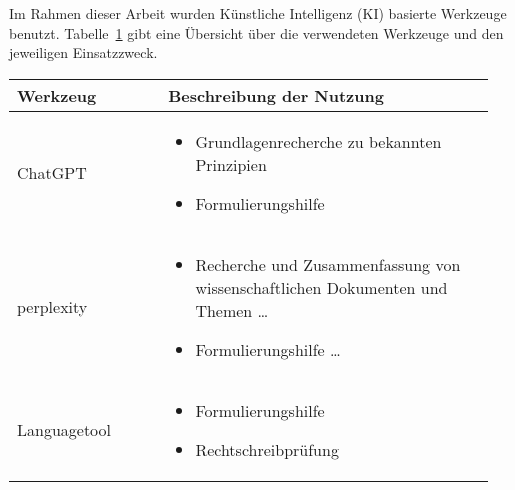 \setcounter{chapter}{1}

Im Rahmen dieser Arbeit wurden Künstliche Intelligenz (KI) basierte Werkzeuge benutzt. Tabelle~\ref{tab:anhang_uebersicht_KI_werkzeuge} gibt eine Übersicht über die verwendeten Werkzeuge und den jeweiligen Einsatzzweck.

\begin{table}[hbt]	
	\centering
	\renewcommand{\arraystretch}{1.5}	%
	\label{tab:anhang_uebersicht_KI_werkzeuge}
	\begin{tabular}{>{\raggedright\arraybackslash}p{0.3\linewidth} >{\raggedright\arraybackslash}p{0.65\linewidth}}
		\textbf{Werkzeug} & \textbf{Beschreibung der Nutzung}\\
		\hline 
		\hline
		ChatGPT & 	\vspace{-\topsep}
					\begin{itemize}[noitemsep,topsep=0pt,partopsep=0pt,parsep=0pt] 
						\item Grundlagenrecherche zu bekannten Prinzipien 
						\item Formulierungshilfe
				   	\end{itemize} \\
		perplexity &	\vspace{-\topsep}
					\begin{itemize}[noitemsep,topsep=0pt,partopsep=0pt,parsep=0pt] 
					\item Recherche und Zusammenfassung von wissenschaftlichen Dokumenten und  Themen \ldots
					\item Formulierungshilfe \ldots
					\end{itemize} \\ 
		Languagetool	&	\vspace{-\topsep}
	\begin{itemize}[noitemsep,topsep=0pt,partopsep=0pt,parsep=0pt]
		\item Formulierungshilfe 
		\item Rechtschreibprüfung
	\end{itemize} \\ 
		\hline 
	\end{tabular} 
\end{table}


